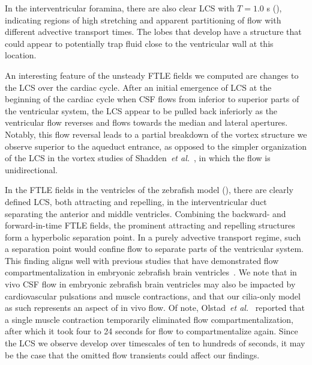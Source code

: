 \documentclass{template}
\begin{document}
In the interventricular foramina, there are also
clear LCS with $T=1.0$ s (),
indicating regions of high stretching and apparent partitioning of flow
with different advective transport times. The lobes that develop
have a structure that could appear to potentially trap fluid
close to the ventricular wall at this location.

An interesting feature of the unsteady FTLE fields we computed
are changes to the LCS over the cardiac cycle. After an initial emergence of LCS
at the beginning of the cardiac cycle when CSF flows from inferior to superior
parts of the ventricular system, the LCS appear to be pulled back inferiorly as the ventricular flow
reverses and flows towards the median and lateral apertures. Notably, this flow reversal
leads to a partial breakdown of the vortex structure we observe superior to the aqueduct entrance,
as opposed to the simpler organization of the LCS in the vortex studies of
Shadden~\emph{et al.}~\citep{shadden2006lagrangian,shadden2007transport},
in which the flow is unidirectional.

In the FTLE fields in the ventricles of the zebrafish model (),
there are clearly defined LCS, both attracting and repelling,
in the interventricular duct separating the anterior and middle ventricles.
Combining the backward- and forward-in-time FTLE fields,
the prominent attracting and repelling structures form a hyperbolic separation point. 
In a purely advective transport regime, such a separation point would confine
flow to separate parts of the ventricular system.
This finding aligns well with previous studies that have demonstrated flow
compartmentalization in embryonic zebrafish
brain ventricles~\citep{Olstad2019CiliaryDevelopment,
Herlyng2025AdvectionDiffusion}. We note that
in vivo CSF flow in embryonic zebrafish brain ventricles may also be impacted
by cardiovascular pulsations and muscle contractions, and that our cilia-only model
as such represents an aspect of in vivo flow. Of note,
Olstad~\emph{et al.}~\citep{Olstad2019CiliaryDevelopment} reported that a single
muscle contraction temporarily eliminated flow compartmentalization, after which
it took four to 24 seconds for flow to compartmentalize again. Since the LCS 
we observe develop over timescales of ten to hundreds of seconds, it may be the
case that the omitted flow transients could affect our findings.
\end{document}
